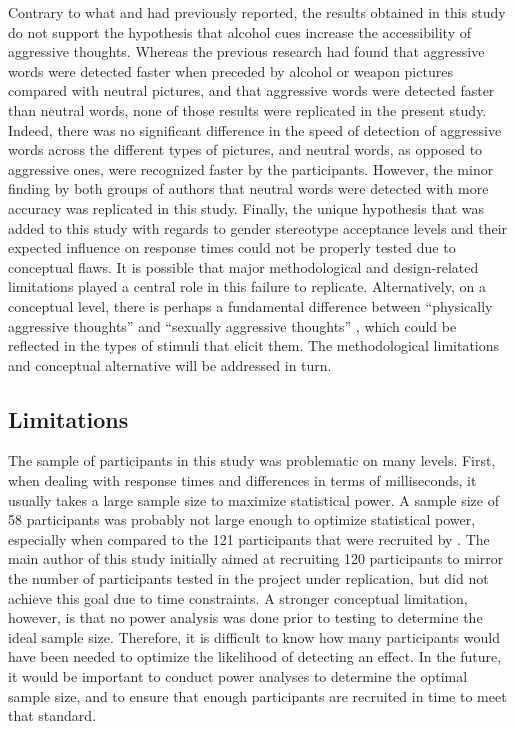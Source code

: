 \documentclass[serif, twocolumn, numeric, empirical]{jote-article}
\begin{document}
Contrary to what \textcite{BartholowHeinz2006} and \textcite{SubraMullerBegueLBushmanDelmas2010} had previously reported, the results obtained in this study do not support the hypothesis that alcohol cues increase the accessibility of aggressive thoughts. Whereas the previous research had found that aggressive words were detected faster when preceded by alcohol or weapon pictures compared with neutral pictures, and that aggressive words were detected faster than neutral words, none of those results were replicated in the present study. Indeed, there was no significant difference in the speed of detection of aggressive words across the different types of pictures, and neutral words, as opposed to aggressive ones, were recognized faster by the participants. However, the minor finding by both groups of authors that neutral words were detected with more accuracy was replicated in this study. Finally, the unique hypothesis that was added to this study with regards to gender stereotype acceptance levels and their expected influence on response times could not be properly tested due to conceptual flaws. It is possible that major methodological and design-related limitations played a central role in this failure to replicate. Alternatively, on a conceptual level, there is perhaps a fundamental difference between ``physically aggressive thoughts”  and ``sexually aggressive thoughts” , which could be reflected in the types of stimuli that elicit them. The methodological limitations and conceptual alternative will be addressed in turn. 

{}
\subsection*{Limitations}
The sample of participants in this study was problematic on many levels. First, when dealing with response times and differences in terms of milliseconds, it usually takes a large sample size to maximize statistical power. A sample size of 58 participants was probably not large enough to optimize statistical power, especially when compared to the 121 participants that were recruited by \textcite{BartholowHeinz2006}. The main author of this study initially aimed at recruiting 120 participants to mirror the number of participants tested in the project under replication, but did not achieve this goal due to time constraints. A stronger conceptual limitation, however, is that no power analysis was done prior to testing to determine the ideal sample size. Therefore, it is difficult to know how many participants would have been needed to optimize the likelihood of detecting an effect. In the future, it would be important to conduct power analyses to determine the optimal sample size, and to ensure that enough participants are recruited in time to meet that standard. 
\end{document}
